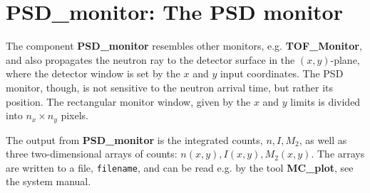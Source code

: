 
\section{PSD\_monitor: The PSD monitor}


The component {\bf PSD\_monitor} resembles other monitors, e.g.
{\bf TOF\_Monitor}, and also propagates the neutron ray to the detector
surface in the $(x,y)$-plane, where the detector window is set
by the $x$ and $y$ input coordinates.
The PSD monitor, though, is not sensitive to the neutron arrival time, but
rather its position. The rectangular monitor window, given by the $x$ and $y$
limits is divided into $n_x \times n_y$ pixels.

The output from {\bf PSD\_monitor} is the integrated counts, $n, I, M_2$,
as well as
three two-dimensional arrays of counts: $n(x,y), I(x,y), M_2(x,y)$.
The arrays are written to a file, \verb+filename+, and can be read e.g. by the tool
{\bf MC\_plot}, see the system manual.
